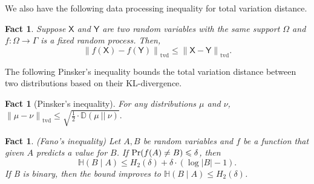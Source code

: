 \documentclass[11pt]{article}
\newtheorem{fact}[lemma]{Fact}
\theoremstyle{definition}
\renewcommand{\leq}{\leqslant}
\newcommand{\tvd}[2]{\ensuremath{\norm{#1 - #2}_{\mathrm{tvd}}}}
\newcommand{\norm}[1]{\ensuremath{\|#1\|}}
\DeclareMathOperator*{\Prob}{\ensuremath{\textnormal{Pr}}}
\renewcommand{\Pr}{\Prob}
\newcommand{\rv}[1]{\ensuremath{{\mathsf{#1}}}\xspace}
\newcommand{\rX}{\rv{X}}
\newcommand{\rY}{\rv{Y}}
\newcommand{\kl}[2]{\ensuremath{\mathbb{D}(#1~||~#2)}}
\newcommand{\HH}{\ensuremath{\mathbb{H}}}
\newcommand{\en}[1]{\ensuremath{\HH(#1)}}
\begin{document}
We also have the following data processing inequality for total variation distance. 

\begin{fact}\label{fact:tvd-data-processing}
	Suppose $\rX$ and $\rY$ are two random variables with the same support $\Omega$ and $f: \Omega \rightarrow \Gamma$ is a fixed random process.  Then,
	\[
		\tvd{f(\rX)}{f(\rY)} \leq \tvd{\rX}{\rY}. 
	\]
\end{fact}

The following Pinsker's inequality bounds the total variation distance between two distributions based on their KL-divergence.

\begin{fact}[Pinsker's inequality]\label{fact:pinskers}
	For any distributions $\mu$ and $\nu$, 
	$
	\tvd{\mu}{\nu} \leq \sqrt{\frac{1}{2} \cdot \kl{\mu}{\nu}}.
	$ 
\end{fact}

\begin{fact}\label{fact:Fanos-inequality}(Fano's inequality) Let $A, B$ be random variables and $f$ be a function that given $A$ predicts a value for $B$. If $\Pr(f(A)\ne B)\leq \delta$, then 
	\[
	\en{B\mid A}\leq H_2(\delta)+\delta\cdot \left(\log \left|B\right|-1\right).
	\]
	If B is binary, then the bound improves to $\en{B \mid A} \leq H_2(\delta)$.
\end{fact}

\end{document}
